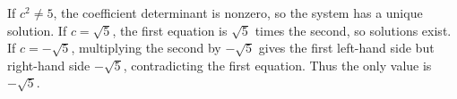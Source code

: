 If $c^2\ne5$, the coefficient determinant is nonzero, so the system has a unique solution. If $c=\sqrt5$, the first equation is $\sqrt5$ times the second, so solutions exist. If $c=-\sqrt5$, multiplying the second by $-\sqrt5$ gives the first left-hand side but right-hand side $-\sqrt5$, contradicting the first equation. Thus the only value is $\boxed{-\sqrt5}$.
